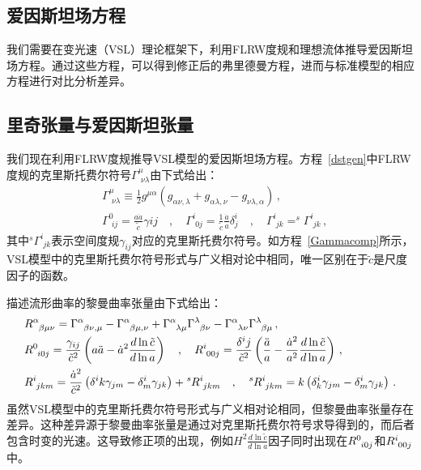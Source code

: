 \documentclass[jkps,preprint,fleqn]{revtex4}
\newcommand{\tc}{\tilde{c}}
\begin{document}
\begin{CJK*}{UTF8}{gbsn}
\section{爱因斯坦场方程} \label{sec:EFEs}

我们需要在变光速（VSL）理论框架下，利用FLRW度规和理想流体推导爱因斯坦场方程。通过这些方程，可以得到修正后的弗里德曼方程，进而与标准模型的相应方程进行对比分析差异。
\subsection{里奇张量与爱因斯坦张量}\label{subsec:RS}
我们现在利用FLRW度规推导VSL模型的爱因斯坦场方程\cite{Lee:2020zts,Lee:2025rpw}。方程~\eqref{dstgen}中FLRW度规的克里斯托费尔符号$\Gamma^{\mu}_{\,\,\nu\lambda}$由下式给出：
\begin{align}
&\Gamma^{\mu}_{\,\,\nu\lambda} \equiv \frac{1}{2} g^{\mu\alpha} \left( g_{\alpha\nu,\lambda} + g_{\alpha\lambda,\nu} - g_{\nu\lambda,\alpha} \right) \label{Gamma}\,, \\ &\Gamma^{0}_{\,\,ij} = \frac{a\dot{a}}{\tc} \gamma{ij} \quad , \quad \Gamma^{i}_{\,\,0j} = \frac{1}{\tc}  \frac{\dot{a}}{a} \delta^i_j \quad , \quad \Gamma^{i}_{\,\,jk} = ^{s}\Gamma^{i}_{\,\,jk}  \label{Gammacomp} \,, \end{align}
其中$^{s}\Gamma^{i}_{\,\,jk}$表示空间度规$\gamma_{ij}$对应的克里斯托费尔符号。如方程~\eqref{Gammacomp}所示，VSL模型中的克里斯托费尔符号形式与广义相对论中相同，唯一区别在于$\tc$是尺度因子的函数。

描述流形曲率的黎曼曲率张量由下式给出：
\begin{align}
&\tensor{R}{^\alpha_\beta_\mu_\nu} = \tensor{\Gamma}{^\alpha_\beta_\nu_,_\mu} - \tensor{\Gamma}{^\alpha_\beta_\mu_,_\nu} + \tensor{\Gamma}{^\alpha_\lambda_\mu} \tensor{\Gamma}{^\lambda_\beta_\nu} - \tensor{\Gamma}{^\alpha_\lambda_\nu} \tensor{\Gamma}{^\lambda_\beta_\mu} \label{Rabmu} \,, \\ &\tensor{R}{^0_i_0_j} = \frac{\gamma_{ij}}{\tc^2} \left( a \ddot{a} - \dot{a}^2 \frac{d \ln \tc}{d \ln a} \right) \quad , \quad \tensor{R}{^i_0_0_j} = \frac{\delta^{i}{j}}{\tc^2} \left( \frac{\ddot{a}}{a} - \frac{\dot{a}^2}{a^2} \frac{d \ln \tc}{ d \ln a}  \right) \,, \label{R0i0j} \\ &\tensor{R}{^i_j_k_m} = \frac{\dot{a}^2}{\tc^2} \left( \delta^{i}{k} \gamma_{jm} - \delta^i_m \gamma_{jk} \right) + \tensor[^s]{R}{^i_j_k_m} \quad , \quad \tensor[^s]{R}{^i_j_k_m} = k \left( \delta^i_k \gamma_{jm} - \delta^i_m \gamma_{jk} \right) \,. \label{Rijkm} \end{align}
虽然VSL模型中的克里斯托费尔符号形式与广义相对论相同，但黎曼曲率张量存在差异。这种差异源于黎曼曲率张量是通过对克里斯托费尔符号求导得到的，而后者包含时变的光速。这导致修正项的出现，例如$H^2 \frac{d \ln \tc}{d \ln a}$因子同时出现在$\tensor{R}{^0_i_0_j}$和$\tensor{R}{^i_0_0_j}$中。


\end{CJK*}
\end{document}
